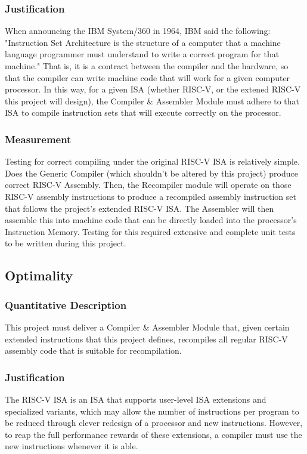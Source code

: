 \documentclass[11pt, oneside]{article}      %
\begin{document}
\subsubsection{Justification}
When announcing the IBM System/360 in 1964, IBM said the following: "Instruction Set Architecture is the structure of a computer that a machine language programmer must understand to write a correct program for that machine."\cite{IBM1964} That is, it is a contract between the compiler and the hardware, so that the compiler can write machine code that will work for a given computer processor. In this way, for a given ISA (whether RISC-V, or the extened RISC-V this project will design), the Compiler \& Assembler Module must adhere to that ISA to compile instruction sets that will execute correctly on the processor.
\subsubsection{Measurement}
Testing for correct compiling under the original RISC-V ISA is relatively simple. Does the Generic Compiler (which shouldn't be altered by this project) produce correct RISC-V Assembly. Then, the Recompiler module will operate on those RISC-V assembly instructions to produce a recompiled assembly instruction set that follows the project's extended RISC-V ISA. The Assembler will then assemble this into machine code that can be directly loaded into the processor's Instruction Memory. Testing for this required extensive and complete unit tests to be written during this project.

\subsection{Optimality}
\subsubsection{Quantitative Description}
This project must deliver a Compiler \& Assembler Module that, given certain extended instructions that this project defines, recompiles all regular RISC-V assembly code that is suitable for recompilation. 
\subsubsection{Justification}
The RISC-V \ac{ISA} is an ISA that supports user-level ISA extensions and specialized variants\cite{Isa2012}, which may allow the number of instructions per program to be reduced through clever redesign of a processor and new instructions. However, to reap the full performance rewards of these extensions, a compiler must use the new instructions whenever it is able.
\end{document}
